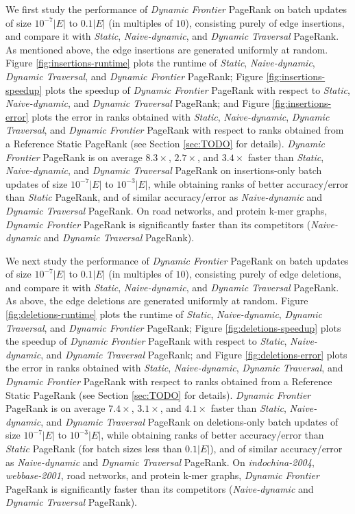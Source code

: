 We first study the performance of \textit{Dynamic Frontier} PageRank on batch updates of size $10^{-7}|E|$ to $0.1|E|$ (in multiples of $10$), consisting purely of edge insertions, and compare it with \textit{Static}, \textit{Naive-dynamic}, and \textit{Dynamic Traversal} PageRank. As mentioned above, the edge insertions are generated uniformly at random. Figure \ref{fig:insertions-runtime} plots the runtime of \textit{Static}, \textit{Naive-dynamic}, \textit{Dynamic Traversal}, and \textit{Dynamic Frontier} PageRank; Figure \ref{fig:insertions-speedup} plots the speedup of \textit{Dynamic Frontier} PageRank with respect to \textit{Static}, \textit{Naive-dynamic}, and \textit{Dynamic Traversal} PageRank; and Figure \ref{fig:insertions-error} plots the error in ranks obtained with \textit{Static}, \textit{Naive-dynamic}, \textit{Dynamic Traversal}, and \textit{Dynamic Frontier} PageRank with respect to ranks obtained from a Reference Static PageRank (see Section \ref{sec:TODO} for details). \textit{Dynamic Frontier} PageRank is on average $8.3\times$, $2.7\times$, and $3.4\times$ faster than \textit{Static}, \textit{Naive-dynamic}, and \textit{Dynamic Traversal} PageRank on insertions-only batch updates of size $10^{-7}|E|$ to $10^{-3}|E|$, while obtaining ranks of better accuracy/error than \textit{Static} PageRank, and of similar accuracy/error as \textit{Naive-dynamic} and \textit{Dynamic Traversal} PageRank. On road networks, and protein k-mer graphs, \textit{Dynamic Frontier} PageRank is significantly faster than its competitors (\textit{Naive-dynamic} and \textit{Dynamic Traversal} PageRank).

We next study the performance of \textit{Dynamic Frontier} PageRank on batch updates of size $10^{-7}|E|$ to $0.1|E|$ (in multiples of $10$), consisting purely of edge deletions, and compare it with \textit{Static}, \textit{Naive-dynamic}, and \textit{Dynamic Traversal} PageRank. As above, the edge deletions are generated uniformly at random. Figure \ref{fig:deletions-runtime} plots the runtime of \textit{Static}, \textit{Naive-dynamic}, \textit{Dynamic Traversal}, and \textit{Dynamic Frontier} PageRank; Figure \ref{fig:deletions-speedup} plots the speedup of \textit{Dynamic Frontier} PageRank with respect to \textit{Static}, \textit{Naive-dynamic}, and \textit{Dynamic Traversal} PageRank; and Figure \ref{fig:deletions-error} plots the error in ranks obtained with \textit{Static}, \textit{Naive-dynamic}, \textit{Dynamic Traversal}, and \textit{Dynamic Frontier} PageRank with respect to ranks obtained from a Reference Static PageRank (see Section \ref{sec:TODO} for details). \textit{Dynamic Frontier} PageRank is on average $7.4\times$, $3.1\times$, and $4.1\times$ faster than \textit{Static}, \textit{Naive-dynamic}, and \textit{Dynamic Traversal} PageRank on deletions-only batch updates of size $10^{-7}|E|$ to $10^{-3}|E|$, while obtaining ranks of better accuracy/error than \textit{Static} PageRank (for batch sizes less than $0.1|E|$), and of similar accuracy/error as \textit{Naive-dynamic} and \textit{Dynamic Traversal} PageRank. On \textit{indochina-2004}, \textit{webbase-2001}, road networks, and protein k-mer graphs, \textit{Dynamic Frontier} PageRank is significantly faster than its competitors (\textit{Naive-dynamic} and \textit{Dynamic Traversal} PageRank).

